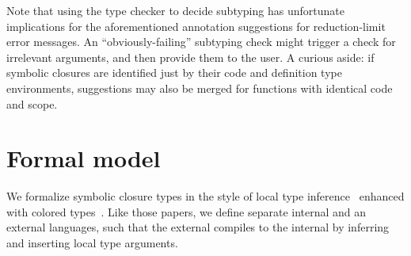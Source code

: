 Note that using the type checker to decide subtyping
has unfortunate implications for 
the aforementioned annotation suggestions
for reduction-limit error messages.
An ``obviously-failing'' subtyping check might trigger a
check for irrelevant arguments, and then provide them to the user.
A curious aside: if symbolic closures are identified just by their code and definition
type environments, suggestions may also be merged for functions with
identical code and scope.

%




\section{Formal model}

We formalize symbolic closure types in the style of local type inference~\cite{PierceLTI}
enhanced with colored types~\cite{coloredlti01}.
Like those papers, we define separate internal and an external languages,
such that the external compiles to the internal by inferring 
and inserting local type arguments.

